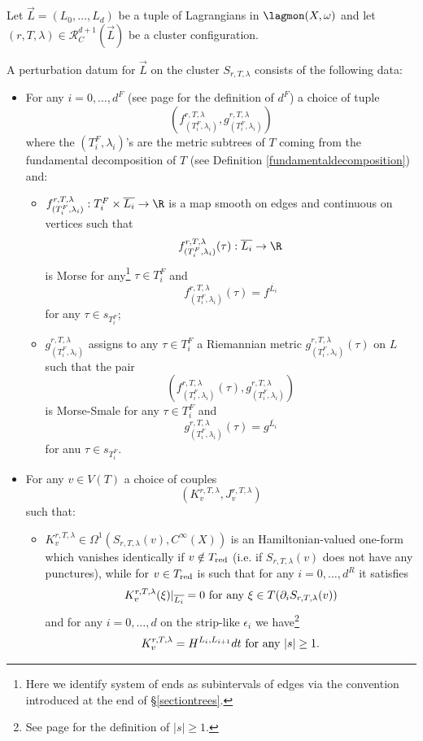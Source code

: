 Let $\vec{L}=(L_0,\ldots,L_d)$ be a tuple of Lagrangians in $\lagmon(X,\omega)$ and let $(r,T,\lambda)\in \mathcal{R}^{d+1}_C(\vec{L})$ be a cluster configuration. \begin{dfn}\label{maindefofpd}
	A perturbation datum for $\vec{L}$ on the cluster $S_{r,T,\lambda}$ consists of the following data:
	\begin{itemize}\label{pdgen2}
		\item For any $i=0,\ldots,d^F$ (see page \pageref{defofmis} for the definition of $d^F$) a choice of tuple $$\left(f^{r,T,\lambda}_{(T_i^F,\lambda_i)}, g^{r,T,\lambda}_{(T_i^F,\lambda_i)}\right)$$ where the $(T_i^F,\lambda_i)$'s are the metric subtrees of $T$ coming from the fundamental decomposition of $T$ (see Definition \ref{fundamentaldecomposition}) and: \begin{itemize}
			\item $f^{r,T,\lambda}_{(T_i^F,\lambda_i)}:T_i^F\times \overline{L_i}\to \R$ is a map smooth on edges and continuous on vertices such that $$f^{r,T,\lambda}_{(T_i^F,\lambda_i)}(\tau):\overline{L_i}\to \R$$ is Morse for any\footnote{Here we identify system of ends as subintervals of edges via the convention introduced at the end of \S \ref{sectiontrees}.} $\tau\in T_i^F$ and $$f^{r,T,\lambda}_{(T_i^F,\lambda_i)}(\tau)=f^{\overline{L_i}}$$ for any $\tau\in s_{T_i^F}$;
			\item $g^{r,T,\lambda}_{(T_i^F,\lambda_i)}$ assigns to any $\tau\in T_i^F$ a Riemannian metric $g^{r,T,\lambda}_{(T_i^F,\lambda_i)}(\tau)$ on $L$ such that the pair $$(f^{r,T,\lambda}_{(T_i^F,\lambda_i)}(\tau),g^{r,T,\lambda}_{(T_i^F,\lambda_i)})$$ is Morse-Smale for any $\tau\in T_i^F$ and $$g^{r,T,\lambda}_{(T_i^F,\lambda_i)}(\tau)=g^{\overline{L_i}} $$ for anu $\tau\in s_{T_i^F}$.
		\end{itemize}
		\item For any $v\in V(T)$ a choice of couples $$(K^{r,T,\lambda}_v,J^{r,T,\lambda}_v)$$ such that:
		\begin{itemize}
			\item $K^{r,T,\lambda}_v\in \Omega^1(S_{r,T,\lambda}(v), C^\infty(X))$ is an Hamiltonian-valued one-form which vanishes identically if $v\notin T_\textnormal{red}$ (i.e. if $S_{r,T,\lambda}(v)$ does not have any punctures), while for $v\in T_\textnormal{red}$ is such that for any $i=0,\ldots,d^R$ it satisfies $$K^{r,T,\lambda}_v(\xi)|_{\overline{L_i}}=0 \textnormal{ for any } \xi\in T(\partial_iS_{r,T,\lambda}(v))$$ and for any $i=0,\ldots, d$ on the strip-like $\epsilon_i$ we have\footnote{See page \pageref{striplikends} for the definition of $|s|\geq 1$.} $$K^{r,T,\lambda}_v=H^{L_i,L_{i+1}} dt \textnormal{ for any }|s|\geq 1.$$

\end{itemize}
\end{itemize}
\end{dfn}
